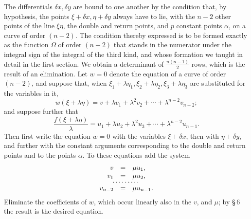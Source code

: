 \documentclass[10pt]{article}
\begin{document}
The differentials \(\delta x,\delta y\) are bound to one another by the condition that, by hypothesis, the points \(\xi+\delta x,\eta+\delta y\) always have to lie, with the \(n-2\) other points of the line \(\xi\eta\), the double and return points, and \(p\) constant points \(\alpha\), on a curve of order \((n-2)\). The condition thereby expressed is to be formed exactly as the function \(\Omega\) of order \((n-2)\) that stands in the numerator under the integral sign of the integral of the third kind, and whose formation we taught in detail in the first section. We obtain a determinant of \(\frac{n(n-1)}{2}\) rows, which is the result of an elimination. Let \(w=0\) denote the equation of a curve of order \((n-2)\), and suppose that, when \(\xi_1+\lambda\eta_1,\xi_2+\lambda\eta_2,\xi_3+\lambda\eta_3\) are substituted for the variables in it,
\[
w(\xi+\lambda\eta)=v+\lambda v_1+\lambda^2v_2+\cdots+\lambda^{n-2}v_{n-2};
\]
and suppose further that
\[
\frac{f(\xi+\lambda\eta)}{\lambda}=u_1+\lambda u_2+\lambda^2u_3+\cdots+\lambda^{n-2}u_{n-1}.
\]
Then first write the equation \(w=0\) with the variables \(\xi+\delta x\), then with \(\eta+\delta y\), and further with the constant arguments corresponding to the double and return points and to the points \(\alpha\). To these equations add the system
\[
\begin{array}{rcl}
v&=&\mu u_1,\\
v_1&=&\mu u_2,\\[-0.3em]
\multicolumn{3}{c}{\cdots\cdots\cdots}\\[-0.3em]
v_{n-2}&=&\mu u_{n-1}.
\end{array}
\]
Eliminate the coefficients of \(w\), which occur linearly also in the \(v\), and \(\mu\); by \S\,6 the result is the desired equation.
\end{document}
